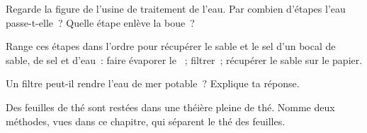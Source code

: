 \begin{exercise}[$\star$]\label{exo:g3:separating-mixtures:8}
Regarde la figure de l'usine de traitement de l'eau. Par combien
d'étapes l'eau passe-t-elle~? Quelle étape enlève la boue~?
\end{exercise}

\begin{exercise}[$\star$]\label{exo:g3:separating-mixtures:9}
Range ces étapes dans l'ordre pour récupérer le sable et le sel d'un
bocal de sable, de sel et d'eau~: faire évaporer le ~; filtrer~;
récupérer le sable sur le papier.
\end{exercise}

\begin{exercise}[$\star\star$]\label{exo:g3:separating-mixtures:10}
Un filtre peut-il rendre l'eau de mer potable~? Explique ta réponse.
\end{exercise}

\begin{exercise}[$\star\star$]\label{exo:g3:separating-mixtures:11}
Des feuilles de thé sont restées dans une théière pleine de thé. Nomme
deux méthodes, vues dans ce chapitre, qui séparent le thé des feuilles.
\end{exercise}
